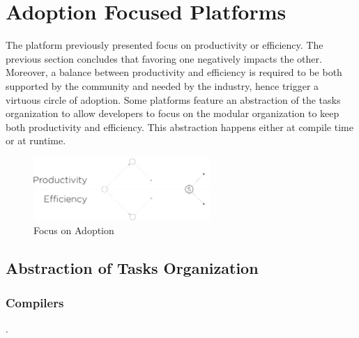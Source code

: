 \section{Adoption Focused Platforms} \label{chapter3:software-adoption}

The platform previously presented focus on productivity or efficiency.
The previous section concludes that favoring one negatively impacts the other.
Moreover, a balance between productivity and efficiency is required to be both supported by the community and needed by the industry, hence trigger a virtuous circle of adoption.
Some platforms feature an abstraction of the tasks organization to allow developers to focus on the modular organization to keep both productivity and efficiency.
This abstraction happens either at compile time or at runtime.


\begin{figure}[!h]
\begin{center}
\includegraphics[width=0.6\textwidth]{../resources/state-of-the-art-5.pdf}
\end{center}
\caption{Focus on Adoption}
\label{fig:state-of-the-art-5}
\end{figure}

\subsection{Abstraction of Tasks Organization}

\subsubsection{Compilers} \label{chapter3:software-adoption:compilers}

.

